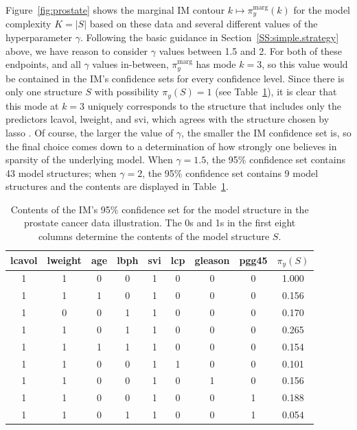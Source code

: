\documentclass[12pt]{article}
\begin{document}
Figure~\ref{fig:prostate} shows the marginal IM contour $k \mapsto \pi_y^\text{marg}(k)$ for the model complexity $K=|S|$ based on these data and several different values of the hyperparameter $\gamma$.  Following the basic guidance in Section~\ref{SS:simple.strategy} above, we have reason to consider $\gamma$ values between 1.5 and 2.  For both of these endpoints, and all $\gamma$ values in-between, $\pi_y^\text{marg}$ has mode $k=3$, so this value would be contained in the IM's confidence sets for every confidence level.  Since there is only one structure $S$ with possibility $\pi_y(S)=1$ (see Table~\ref{table:prostate}), it is clear that this mode at $k=3$ uniquely corresponds to the structure that includes only the predictors lcavol, lweight, and svi, which agrees with the structure chosen by lasso \citep[][Table~1]{tibshirani1996regression}.  Of course, the larger the value of $\gamma$, the smaller the IM confidence set is, so the final choice comes down to a determination of how strongly one believes in sparsity of the underlying model.  When $\gamma=1.5$, the 95\% confidence set contains 43 model structures; when $\gamma=2$, the 95\% confidence set contains 9 model structures and the contents are displayed in Table~\ref{table:prostate}.  

\begin{table}[t]
\begin{center}
\begin{tabular}{ccccccccc}
\hline
lcavol & lweight & age & lbph & svi & lcp & gleason & pgg45 & $\pi_y(S)$ \\
\hline 
1 & 1 & 0 & 0 & 1 & 0 & 0 & 0 & 1.000 \\
1 & 1 & 1 & 0 & 1 & 0 & 0 & 0 & 0.156 \\
1 & 0 & 0 & 1 & 1 & 0 & 0 & 0 & 0.170 \\
1 & 1 & 0 & 1 & 1 & 0 & 0 & 0 & 0.265 \\
1 & 1 & 1 & 1 & 1 & 0 & 0 & 0 & 0.154 \\
1 & 1 & 0 & 0 & 1 & 1 & 0 & 0 & 0.101 \\
1 & 1 & 0 & 0 & 1 & 0 & 1 & 0 & 0.156 \\
1 & 1 & 0 & 0 & 1 & 0 & 0 & 1 & 0.188 \\
1 & 1 & 0 & 1 & 1 & 0 & 0 & 1 & 0.054 \\
\hline 
\end{tabular}
\end{center}
\caption{Contents of the IM's 95\% confidence set for the model structure in the prostate cancer data illustration.  The 0s and 1s in the first eight columns determine the contents of the model structure $S$.}
\label{table:prostate}
\end{table}
\end{document}

